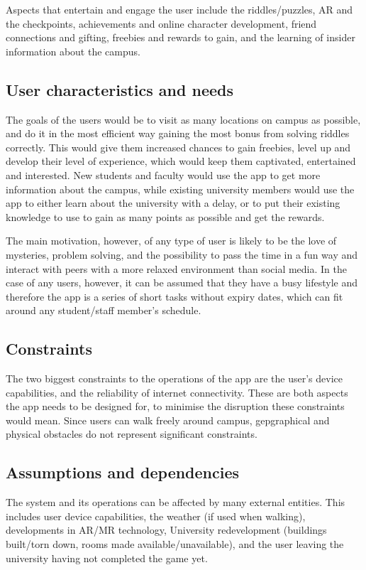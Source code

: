 \documentclass[10pt,twocolumn]{article} %
\begin{document}
Aspects that entertain and engage the user include the riddles/puzzles, AR and the checkpoints, achievements and online character development, friend connections and gifting, freebies and rewards to gain, and the learning of insider information about the campus.

\subsection*{User characteristics and needs}
The goals of the users would be to visit as many locations on campus as possible, and do it in the most efficient way gaining the most bonus from solving riddles correctly. This would give them increased chances to gain freebies, level up and develop their level of experience, which would keep them captivated, entertained and interested. New students and faculty would use the app to get more information about the campus, while existing university members would use the app to either learn about the university with a delay, or to put their existing knowledge to use to gain as many points as possible and get the rewards.

The main motivation, however, of any type of user is likely to be the love of mysteries, problem solving, and the possibility to pass the time in a fun way and interact with peers with a more relaxed environment than social media. In the case of any users, however, it can be assumed that they have a busy lifestyle and therefore the app is a series of short tasks without expiry dates, which can fit around any student/staff member's schedule.

\subsection*{Constraints}
The two biggest constraints to the operations of the app are the user's device capabilities, and the reliability of internet connectivity. These are both aspects the app needs to be designed for, to minimise the disruption these constraints would mean. Since users can walk freely around campus, gepgraphical and physical obstacles do not represent significant constraints.

\subsection*{Assumptions and dependencies}
The system and its operations can be affected by many external entities. This includes user device capabilities, the weather (if used when walking), developments in AR/MR technology, University redevelopment (buildings built/torn down, rooms made available/unavailable), and the user leaving the university having not completed the game yet.
\end{document}

